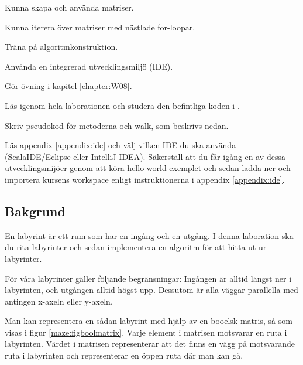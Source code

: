 
\Lab{\LabWeekEIGHT}

\begin{Goals}
\item Kunna skapa och använda matriser.
\item Kunna iterera över matriser med nästlade for-loopar.
\item Träna på algoritmkonstruktion.
\item Använda en integrerad utvecklingsmiljö (IDE).
\end{Goals}

\begin{Preparations}
\item Gör övning {\tt \ExeWeekEIGHT} i kapitel \ref{chapter:W08}.

\item Läs igenom hela laborationen och studera den befintliga koden i .

\item Skriv pseudokod för metoderna  och {walk}, som beskrivs nedan.

\item Läs appendix \ref{appendix:ide} och välj vilken IDE du ska använda (ScalaIDE/Eclipse eller IntelliJ IDEA). Säkerställ att du får igång en av dessa utvecklingsmijöer genom att köra hello-world-exemplet och sedan ladda ner och importera kursens workspace enligt instruktionerna i appendix \ref{appendix:ide}.
\end{Preparations}

\subsection{Bakgrund}

En labyrint är ett rum som har en ingång och en utgång.  I denna laboration ska du rita labyrinter och sedan implementera en algoritm för att hitta ut ur labyrinter.

För våra labyrinter gäller följande begränsningar: Ingången är alltid längst ner i labyrinten, och utgången alltid högst upp. Dessutom är alla väggar parallella med antingen x-axeln eller y-axeln.

Man kan representera en sådan labyrint med hjälp av en booelsk matris, så som visas i figur \ref{maze:figboolmatrix}. Varje element i matrisen motsvarar en ruta i labyrinten. Värdet  i matrisen representerar att det finns en vägg på motsvarande ruta i labyrinten och  representerar en öppen ruta där man kan gå.

